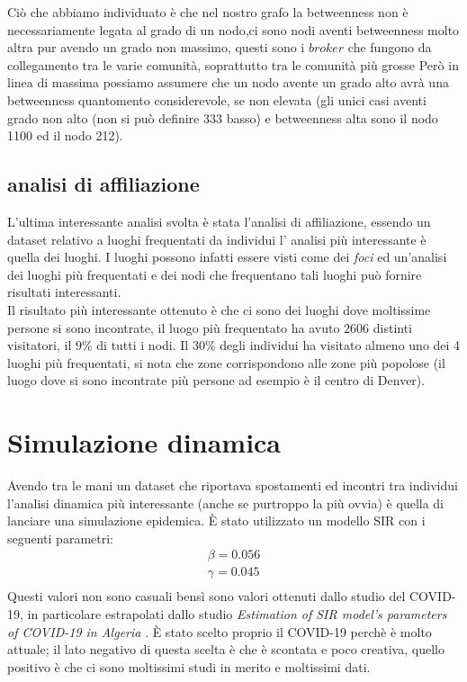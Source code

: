 \documentclass[a4paper]{article}
\begin{document}
Ciò che abbiamo individuato è che nel nostro grafo la betweenness non è necessariamente legata al grado di un nodo,ci sono nodi aventi betweenness molto altra pur avendo un grado non massimo, questi sono i $broker$ che fungono da collegamento tra le varie comunità, soprattutto tra le comunità più grosse 
Però in linea di massima possiamo assumere che un nodo avente un grado alto avrà una betweenness quantomento considerevole, se non elevata (gli unici casi aventi grado non alto (non si può definire 333 basso) e betweenness alta sono il nodo 1100 ed il nodo 212).

\subsection{analisi di affiliazione}
L'ultima interessante analisi svolta è stata l'analisi di affiliazione, essendo un dataset relativo a luoghi frequentati da individui l' analisi più interessante è quella dei luoghi.
I luoghi possono infatti essere visti come dei \textit{foci} ed un'analisi dei luoghi più frequentati e dei nodi che frequentano tali luoghi può fornire risultati interessanti.\\
Il risultato più interessante ottenuto è che ci sono dei luoghi dove moltissime persone si sono incontrate, il luogo più frequentato ha avuto $2606$ distinti visitatori, il $9\%$ di tutti i nodi. Il 30\% degli individui ha visitato almeno uno dei 4 luoghi più frequentati, si nota che zone corrispondono alle zone più popolose (il luogo dove si sono incontrate più persone ad esempio è il centro di Denver).
\section{Simulazione dinamica}
Avendo tra le mani un dataset che riportava spostamenti ed incontri tra individui l'analisi dinamica più interessante (anche se purtroppo la più ovvia) è quella di lanciare una simulazione epidemica.
È stato utilizzato un modello SIR con i seguenti parametri:
\begin{align*}
\beta = 0.056\\
\gamma = 0.045\\
\end{align*}
Questi valori non sono casuali bensì sono valori ottenuti dallo studio del COVID-19, in particolare estrapolati dallo studio \textit{Estimation of SIR model’s parameters of COVID-19 in Algeria} \cite{covid}.
È stato scelto proprio il COVID-19 perchè è molto attuale; il lato negativo di questa scelta è che è scontata e poco creativa, quello positivo è che ci sono moltissimi studi in merito e moltissimi dati.
\end{document}
